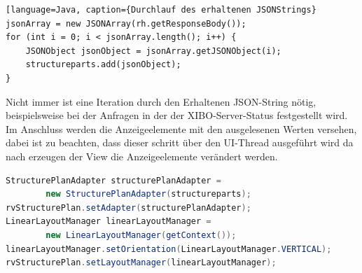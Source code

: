 \begin{lstlisting}[language=Java, caption={Durchlauf des erhaltenen JSONStrings}
jsonArray = new JSONArray(rh.getResponseBody());
for (int i = 0; i < jsonArray.length(); i++) {
	JSONObject jsonObject = jsonArray.getJSONObject(i);
	structureparts.add(jsonObject);
}
\end{lstlisting}
 Nicht immer ist eine Iteration durch den Erhaltenen JSON-String nötig, beispielsweise bei der Anfragen in der der XIBO-Server-Status festgestellt wird. Im Anschluss werden die Anzeigeelemente mit den ausgelesenen Werten versehen, dabei ist zu beachten, dass dieser schritt über den UI-Thread ausgeführt wird da nach erzeugen der View die Anzeigeelemente verändert werden. 
\begin{lstlisting}[language=Java,caption={Zuweisung der Daten an das Anzeigeelement}]
StructurePlanAdapter structurePlanAdapter = 
	 	new StructurePlanAdapter(structureparts);
rvStructurePlan.setAdapter(structurePlanAdapter);
LinearLayoutManager linearLayoutManager = 
		new LinearLayoutManager(getContext());
linearLayoutManager.setOrientation(LinearLayoutManager.VERTICAL);
rvStructurePlan.setLayoutManager(linearLayoutManager);
\end{lstlisting}
\\